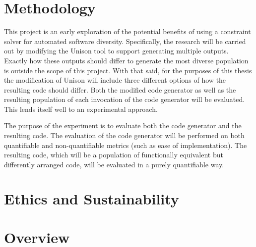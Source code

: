 \section{Methodology}

This project is an early exploration of the potential benefits of using a constraint solver
for automated software diversity. Specifically, the research will be carried out by
modifying the Unison tool to support generating multiple outputs. Exactly how these
outputs should differ to generate the most diverse population is outside the scope of this
project. With that said, for the purposes of this thesis the modification of Unison will
include three different options of how the resulting code should differ. Both the modified
code generator as well as the resulting population of each invocation of the code generator
will be evaluated. This lends itself well to an experimental approach.

The purpose of the experiment is to evaluate both the code generator and the resulting
code. The evaluation of the code generator will be performed on both quantifiable and
non-quantifiable metrics (such as ease of implementation). The resulting code, which will
be a population of functionally equivalent but differently arranged code, will be evaluated
in a purely quantifiable way.

\section{Ethics and Sustainability}

\section{Overview}
